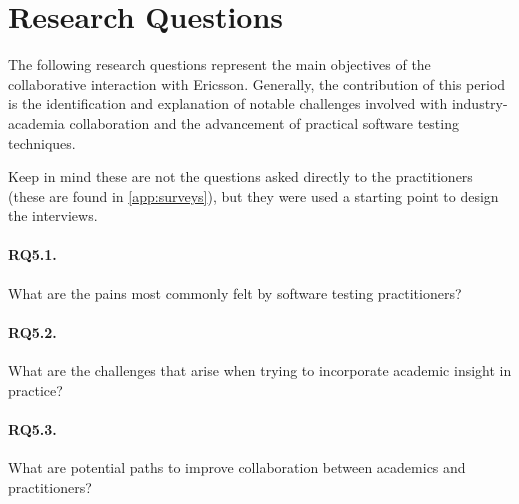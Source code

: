 \section{Research Questions}
\label{sec:ind_rqs}

The following research questions represent the main objectives of the collaborative interaction with Ericsson.
Generally, the contribution of this period is the identification and explanation of notable challenges involved with industry-academia collaboration and the advancement of practical software testing techniques.

Keep in mind these are not the questions asked directly to the practitioners (these are found in \autoref{app:surveys}), but they were used a starting point to design the interviews.

\paragraph{RQ5.1.} What are the pains most commonly felt by software testing practitioners?
\paragraph{RQ5.2.} What are the challenges that arise when trying to incorporate academic insight in practice?
\paragraph{RQ5.3.} What are potential paths to improve collaboration between academics and practitioners?
